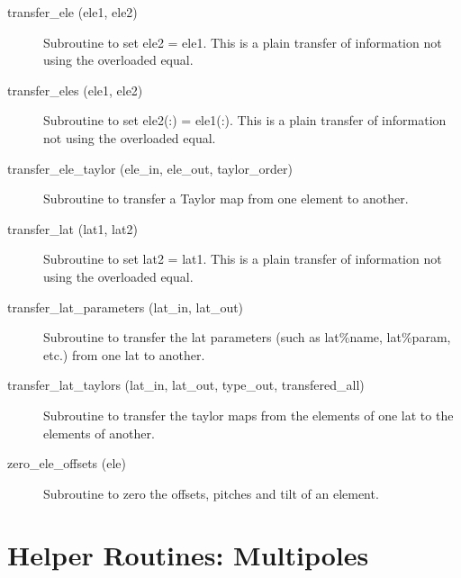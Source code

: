 \begin{description}
\item[transfer_ele (ele1, ele2)] \Newline 
     Subroutine to set ele2 = ele1. 
     This is a plain transfer of information not using the overloaded equal.

\item[transfer_eles (ele1, ele2)] \Newline 
     Subroutine to set ele2(:) = ele1(:). 
     This is a plain transfer of information not using the overloaded equal.

\item[transfer_ele_taylor (ele_in, ele_out, taylor_order)] \Newline 
     Subroutine to transfer a Taylor map from one element to another.

\item[transfer_lat (lat1, lat2)] \Newline 
     Subroutine to set lat2 = lat1. 
     This is a plain transfer of information not using the overloaded equal.

\item[transfer_lat_parameters (lat_in, lat_out)] \Newline
Subroutine to transfer the lat parameters (such as lat\%name, 
lat\%param, etc.) from one lat to another. 

\item[transfer_lat_taylors (lat_in, lat_out, 
                        type_out, transfered_all) ] \Newline 
Subroutine to transfer the taylor maps from the elements of one lat to
the elements of another. 

\item[zero_ele_offsets (ele)] \Newline 
Subroutine to zero the offsets, pitches and tilt of an element.

\end{description}

\section{Helper Routines: Multipoles}
\label{r:multi}    


